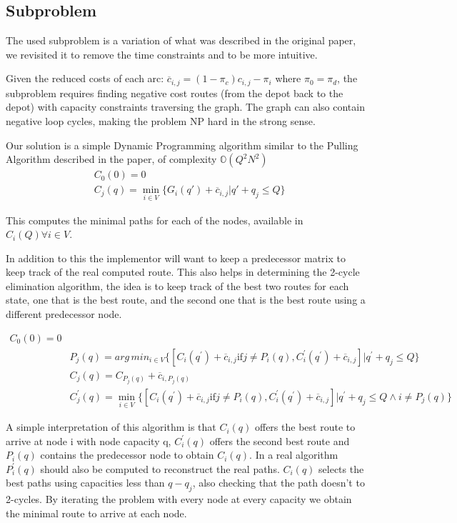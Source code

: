 \subsection{Subproblem}
The used subproblem is a variation of what was described in the original paper, we revisited it to remove the time constraints and to be more intuitive.

Given the reduced costs of each arc: $\overline{c}_{i,j} = (1 - \pi_c)c_{i,j} - \pi_i$ where $\pi_0 = \pi_d$, the subproblem requires finding negative cost routes (from the depot back to the depot) with capacity constraints traversing the graph. The graph can also contain negative loop cycles, making the problem NP hard in the strong sense.

Our solution is a simple Dynamic Programming algorithm similar to the Pulling Algorithm described in the paper, of complexity $\mathbb{O}(Q^2N^2)$
\begin{align*}
  &C_0(0) = 0 \\
  &C_j(q) = \min_{i \in V} \{G_i(q\prime) + \overline{c}_{i,j} | q\prime + q_j \leq Q\}
\end{align*}

This computes the minimal paths for each of the nodes, available in $C_i(Q) \forall i \in V$.

In addition to this the implementor will want to keep a predecessor matrix to keep track of the real computed route. This also helps in determining the 2-cycle elimination algorithm, the idea is to keep track of the best two routes for each state, one that is the best route, and the second one that is the best route using a different predecessor node.

\begin{align*}
  C_0(0) = 0 \\
  &P_j(q) = arg\,min_{i \in V} \{
    [C_i(q^\prime) + \overline{c}_{i,j} \text{if} j \neq P_i(q), C^\prime_i(q^\prime) + \overline{c}_{i,j}] |
    q^\prime + q_j \leq Q
  \} \\
  &C_j(q) = C_{P_j(q)} + \overline{c}_{i,P_j(q)} \\
  &C^\prime_j(q) = \min_{i \in V} \{
    [C_i(q^\prime) + \overline{c}_{i,j} \text{if} j \neq P_i(q), C^\prime_i(q^\prime) + \overline{c}_{i,j}] |
    q^\prime + q_j \leq Q \land i \neq P_j(q)
  \}
\end{align*}

A simple interpretation of this algorithm is that $C_i(q)$ offers the best route to arrive at node i with node capacity q, $C^\prime_i(q)$ offers the second best route and $P_i(q)$ contains the predecessor node to obtain $C_i(q)$. In a real algorithm $P^\prime_i(q)$ should also be computed to reconstruct the real paths. $C_i(q)$ selects the best paths using capacities less than $q - q_j$, also checking that the path doesn't to 2-cycles. By iterating the problem with every node at every capacity we obtain the minimal route to arrive at each node.

